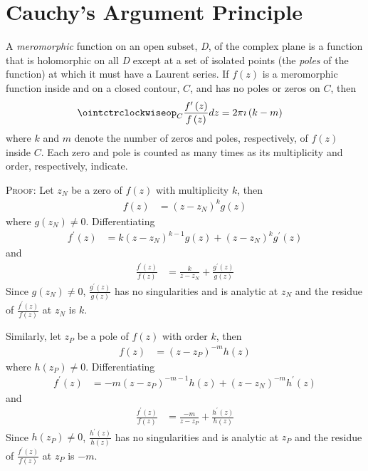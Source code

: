 \documentclass[a4paper,twoside,10pt,english]{report}
\begin{document}
\section{Cauchy's Argument Principle}
A \emph{meromorphic} function on an open subset, \emph{D}, of the complex plane 
is a function that is holomorphic on all \emph{D} except at a set of isolated
points (the \emph{poles} of the function) at which it must have a Laurent 
series. If $f\left(z\right)$ is a meromorphic function inside and on a 
closed contour, $C$, and has no poles or zeros on $C$, then
\begin{align*}
\ointctrclockwiseop_{C}\frac{f^{\prime}\left(z\right)}{f\left(z\right)}dz&=2\pi\imath\left(k-m\right)
\end{align*}
where $k$ and $m$ denote the number of zeros and poles, respectively, of
$f\left(z\right)$ inside $C$. Each zero and pole is counted as many times as
its multiplicity and order, respectively, indicate.

\textsc{Proof:}
Let $z_{N}$ be a zero of $f\left(z\right)$ with multiplicity $k$, then
\begin{align*}
f\left(z\right) &= \left(z-z_{N}\right)^{k}g\left(z\right)
\end{align*}
where $g\left(z_{N}\right) \neq 0$. Differentiating
\begin{align*}
f^{\prime}\left(z\right) &= k\left(z-z_{N}\right)^{k-1}g\left(z\right)+\left(z-z_{N}\right)^{k}g^{\prime}\left(z\right)
\end{align*}
and
\begin{align*}
\frac{f^{\prime}\left(z\right)}{f\left(z\right)} &= \frac{k}{z-z_{N}} + \frac{g^{\prime}\left(z\right)}{g\left(z\right)}
\end{align*}
Since $g\left(z_{N}\right)\ne 0$, 
$\frac{g^{\prime}\left(z\right)}{g\left(z\right)}$ has no singularities and is analytic at $z_{N}$ and the residue of $\frac{f^{\prime}\left(z\right)}{f\left(z\right)}$ at $z_{N}$ is $k$.

Similarly, let $z_{P}$ be a pole of $f\left(z\right)$ with order $k$, then
\begin{align*}
f\left(z\right) &= \left(z-z_{P}\right)^{-m}h\left(z\right)
\end{align*}
where $h\left(z_{P}\right) \neq 0$. Differentiating
\begin{align*}
f^{\prime}\left(z\right) &= -m\left(z-z_{P}\right)^{-m-1}h\left(z\right)+\left(z-z_{N}\right)^{-m}h^{\prime}\left(z\right)
\end{align*}
and
\begin{align*}
\frac{f^{\prime}\left(z\right)}{f\left(z\right)} &= \frac{-m}{z-z_{P}} + \frac{h^{\prime}\left(z\right)}{h\left(z\right)}
\end{align*}
Since $h\left(z_{P}\right)\ne 0$, 
$\frac{h^{\prime}\left(z\right)}{h\left(z\right)}$ has no singularities and is 
analytic at $z_{P}$ and the residue of $\frac{f^{\prime}\left(z\right)}{f\left(z\right)}$ at $z_{P}$ is $-m$.
\end{document}
